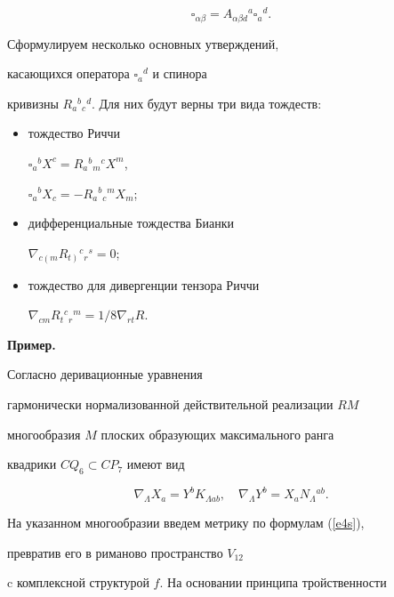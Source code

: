 $$


\label{e70}


\square_{\alpha\beta}=A_{\alpha\beta d}{}^a\square_a{}^d.


$$


Сформулируем несколько основных утверждений,


касающихся оператора $\square_a{}^d$ и спинора


кривизны $R_a{}^b{}_c{}^d$. Для них будут верны три вида тождеств:


\begin{itemize}


\item[1.] тождество Риччи


$\square_a{}^bX^c=R_a{}^b{}_m{}^cX^m$,


$\square_a{}^bX_c=-R_a{}^b{}_c{}^mX_m$;


\item[2.] дифференциальные тождества Бианки


$\nabla_{c\left(\right.m}R_{t\left.\right)}{}^c{}_r{}^s=0$;


\item[3.] тождество для дивергенции тензора Риччи


$\nabla_{cm}R_t{}^c{}_r{}^m=1/8\nabla_{rt}R$.


\end{itemize}





{\bf Пример.}


Согласно \cite{Andr1} деривационные уравнения


гармонически нормализованной действительной реализации $RM$


многообразия $M$ плоских образующих максимального ранга


квадрики $CQ_6\subset CP_7$ имеют вид


\begin{equation}


\label{e77} %


\nabla_\Lambda X_a = Y^b K_{\Lambda ab},\quad


\nabla_\Lambda Y^b = X_a N_\Lambda{}^{ab}.


\end{equation}


На указанном многообразии введем метрику по формулам (\ref{e4s}),


превратив его в риманово пространство $V_{12}$


c комплексной структурой $f$. На основании принципа тройственности


